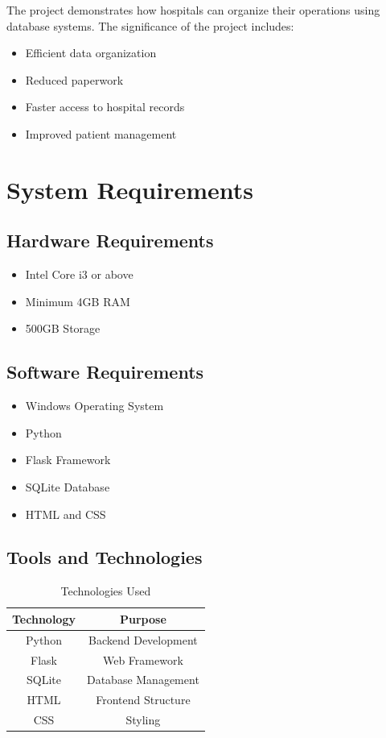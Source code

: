\documentclass[conference]{IEEEtran}
\begin{document}
The project demonstrates how hospitals can organize their operations using database systems. The significance of the project includes:

\begin{itemize}
    \item Efficient data organization
    \item Reduced paperwork
    \item Faster access to hospital records
    \item Improved patient management
\end{itemize}

\section{System Requirements}

\subsection{Hardware Requirements}

\begin{itemize}
    \item Intel Core i3 or above
    \item Minimum 4GB RAM
    \item 500GB Storage
\end{itemize}

\subsection{Software Requirements}

\begin{itemize}
    \item Windows Operating System
    \item Python
    \item Flask Framework
    \item SQLite Database
    \item HTML and CSS
\end{itemize}

\subsection{Tools and Technologies}

\begin{table}[H]
\centering
\caption{Technologies Used}
\begin{tabular}{|c|c|}
\hline
\textbf{Technology} & \textbf{Purpose} \\
\hline
Python & Backend Development \\
\hline
Flask & Web Framework \\
\hline
SQLite & Database Management \\
\hline
HTML & Frontend Structure \\
\hline
CSS & Styling \\
\hline
\end{tabular}
\end{table}
\end{document}
